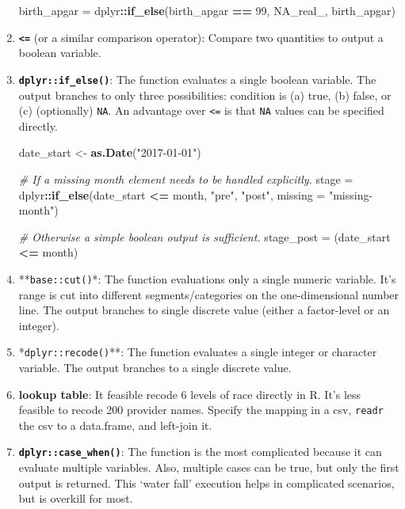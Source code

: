 \documentclass[
]{book}
\newenvironment{Shaded}{\begin{snugshade}}{\end{snugshade}}
\newcommand{\CommentTok}[1]{\textcolor[rgb]{0.56,0.35,0.01}{\textit{#1}}}
\newcommand{\DataTypeTok}[1]{\textcolor[rgb]{0.13,0.29,0.53}{#1}}
\newcommand{\DecValTok}[1]{\textcolor[rgb]{0.00,0.00,0.81}{#1}}
\newcommand{\KeywordTok}[1]{\textcolor[rgb]{0.13,0.29,0.53}{\textbf{#1}}}
\newcommand{\NormalTok}[1]{#1}
\newcommand{\OperatorTok}[1]{\textcolor[rgb]{0.81,0.36,0.00}{\textbf{#1}}}
\newcommand{\OtherTok}[1]{\textcolor[rgb]{0.56,0.35,0.01}{#1}}
\newcommand{\StringTok}[1]{\textcolor[rgb]{0.31,0.60,0.02}{#1}}
\begin{document}
\begin{enumerate}
\begin{Shaded}
\begin{Highlighting}[]
\NormalTok{birth\_apgar =}\StringTok{ }\NormalTok{dplyr}\OperatorTok{::}\KeywordTok{if\_else}\NormalTok{(birth\_apgar }\OperatorTok{==}\StringTok{ }\DecValTok{99}\NormalTok{, }\OtherTok{NA\_real\_}\NormalTok{, birth\_apgar)}
\end{Highlighting}
\end{Shaded}
\item
  \textbf{\texttt{\textless{}=}} (or a similar comparison operator): Compare two quantities to output a boolean variable.
\item
  \textbf{\texttt{dplyr::if\_else()}}: The function evaluates a single boolean variable. The output branches to only three possibilities: condition is (a) true, (b) false, or (c) (optionally) \texttt{NA}. An advantage over \texttt{\textless{}=} is that \texttt{NA} values can be specified directly.

\begin{Shaded}
\begin{Highlighting}[]
\NormalTok{date\_start <{-}}\StringTok{ }\KeywordTok{as.Date}\NormalTok{(}\StringTok{"2017{-}01{-}01"}\NormalTok{)}

\CommentTok{\# If a missing month element needs to be handled explicitly.}
\NormalTok{stage       =}\StringTok{ }\NormalTok{dplyr}\OperatorTok{::}\KeywordTok{if\_else}\NormalTok{(date\_start }\OperatorTok{<=}\StringTok{ }\NormalTok{month, }\StringTok{"pre"}\NormalTok{, }\StringTok{"post"}\NormalTok{, }\DataTypeTok{missing =} \StringTok{"missing{-}month"}\NormalTok{)}

\CommentTok{\# Otherwise a simple boolean output is sufficient.}
\NormalTok{stage\_post  =}\StringTok{ }\NormalTok{(date\_start }\OperatorTok{<=}\StringTok{ }\NormalTok{month)}
\end{Highlighting}
\end{Shaded}
\item
  **\texttt{base::cut()}*: The function evaluations only a single numeric variable. It's range is cut into different segments/categories on the one-dimensional number line. The output branches to single discrete value (either a factor-level or an integer).
\item
  *\texttt{dplyr::recode()}**: The function evaluates a single integer or character variable. The output branches to a single discrete value.
\item
  \textbf{lookup table}: It feasible recode 6 levels of race directly in R. It's less feasible to recode 200 provider names. Specify the mapping in a csv, \texttt{readr} the csv to a data.frame, and left-join it.
\item
  \textbf{\texttt{dplyr::case\_when()}}: The function is the most complicated because it can evaluate multiple variables. Also, multiple cases can be true, but only the first output is returned. This `water fall' execution helps in complicated scenarios, but is overkill for most.
\end{enumerate}
\end{document}
